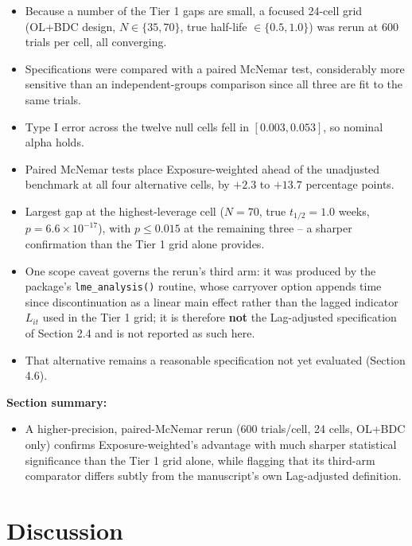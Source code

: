 \documentclass[
  11pt,
]{article}
\providecommand{\tightlist}{%
  \setlength{\itemsep}{0pt}\setlength{\parskip}{0pt}}
\begin{document}
\begin{itemize}
\tightlist
\item
  Because a number of the Tier 1 gaps are small, a focused 24-cell
  grid (OL+BDC design, \(N \in \{35, 70\}\), true half-life \(\in \{0.5,
  1.0\}\)) was rerun at 600 trials per cell, all converging.
\item
  Specifications were compared with a paired McNemar test,
  considerably more sensitive than an independent-groups comparison
  since all three are fit to the same trials.
\item
  Type I error across the twelve null cells fell in \([0.003, 0.053]\),
  so nominal alpha holds.
\item
  Paired McNemar tests place Exposure-weighted ahead of the unadjusted
  benchmark at all four alternative cells, by \(+2.3\) to \(+13.7\)
  percentage points.
\item
  Largest gap at the highest-leverage cell (\(N=70\), true
  \(t_{1/2}=1.0\) weeks, \(p = 6.6 \times 10^{-17}\)), with \(p \leq
  0.015\) at the remaining three -- a sharper confirmation than the
  Tier 1 grid alone provides.
\item
  One scope caveat governs the rerun's third arm: it was produced by
  the package's \texttt{lme\_analysis()} routine, whose carryover option
  appends time since discontinuation as a linear main effect rather
  than the lagged indicator \(L_{it}\) used in the Tier 1 grid; it is
  therefore \textbf{not} the Lag-adjusted specification of Section 2.4 and
  is not reported as such here.
\item
  That alternative remains a reasonable specification not yet
  evaluated (Section 4.6).
\end{itemize}

\textbf{Section summary:}

\begin{itemize}
\tightlist
\item
  A higher-precision, paired-McNemar rerun (600 trials/cell, 24
  cells, OL+BDC only) confirms Exposure-weighted's advantage with
  much sharper statistical significance than the Tier 1 grid alone,
  while flagging that its third-arm comparator differs subtly from
  the manuscript's own Lag-adjusted definition.
\end{itemize}

\section{Discussion}\label{discussion}
\end{document}
